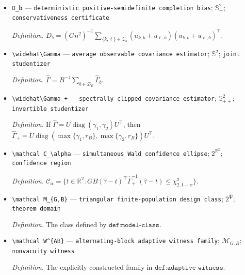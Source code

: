 \documentclass{article}
\begin{document}
\begin{itemize}
  \item \texttt{D\_\allowbreak{}b} --- \texttt{deterministic positive-\allowbreak{}semidefinite completion bias}; \(\mathbb S_+^2\); \texttt{conservativeness certificate}
  \par\smallskip\noindent\emph{Definition.} \(D_b=(Gn^2)^{-1}\sum_{\{k,\ell\}\in\mathcal Z_b}(u_{k,b}+u_{\ell,b})(u_{k,b}+u_{\ell,b})^\top\).
  \item \texttt{\textbackslash{}\allowbreak{}widehat\textbackslash{}\allowbreak{}Gamma} --- \texttt{average observable covariance estimator}; \(\mathbb S^2\); \texttt{joint studentizer}
  \par\smallskip\noindent\emph{Definition.} \(\widehat\Gamma=B^{-1}\sum_{b\in\mathcal B_B}\widehat\Gamma_b\).
  \item \texttt{\textbackslash{}\allowbreak{}widehat\textbackslash{}\allowbreak{}Gamma\_\allowbreak{}+\allowbreak{}} --- \texttt{spectrally clipped covariance estimator}; \(\mathbb S_{++}^2\); \texttt{invertible studentizer}
  \par\smallskip\noindent\emph{Definition.} If \(\widehat\Gamma=U\operatorname{diag}(\gamma_1,\gamma_2)U^\top\), then \(\widehat\Gamma_+=U\operatorname{diag}(\max\{\gamma_1,r_B\},\max\{\gamma_2,r_B\})U^\top\).
  \item \texttt{\textbackslash{}\allowbreak{}mathcal C\_\allowbreak{}\textbackslash{}\allowbreak{}alpha} --- \texttt{simultaneous Wald confidence ellipse}; \(2^{\mathbb R^2}\); \texttt{confidence region}
  \par\smallskip\noindent\emph{Definition.} \(\mathcal C_\alpha=\{t\in\mathbb R^2:GB(\widehat\tau-t)^\top\widehat\Gamma_+^{-1}(\widehat\tau-t)\leq\chi^2_{2,1-\alpha}\}\).
  \item \texttt{\textbackslash{}\allowbreak{}mathcal M\_\allowbreak{}\{G,\allowbreak{}B\}\allowbreak{}} --- \texttt{triangular finite-\allowbreak{}population design class}; \(2^{\mathfrak P}\); \texttt{theorem domain}
  \par\smallskip\noindent\emph{Definition.} The class defined by \(\texttt{def:model-class}\).
  \item \texttt{\textbackslash{}\allowbreak{}mathcal W\textasciicircum{}\{AB\}\allowbreak{}} --- \texttt{alternating-\allowbreak{}block adaptive witness family}; \(\mathcal M_{G,B}\); \texttt{nonvacuity witness}
  \par\smallskip\noindent\emph{Definition.} The explicitly constructed family in \(\texttt{def:adaptive-witness}\).
\end{itemize}
\end{document}
